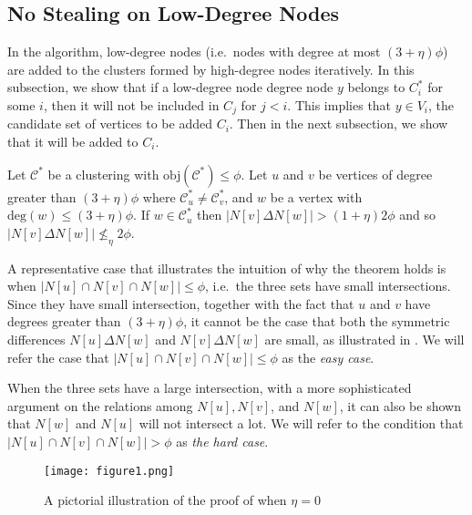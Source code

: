 \subsection{No Stealing on Low-Degree Nodes}\label{sec:nostealing}
In the algorithm, low-degree nodes (i.e.~nodes with degree at most $(3+\eta)\phi$) are added to the clusters formed by high-degree nodes iteratively. In this subsection, we show that if a low-degree node degree node $y$ belongs to $C^{*}_i$ for some $i$, then it will not be included in $C_j$ for $j<i$. This implies that $y \in V_i$, the candidate set of vertices to be added $C_i$. Then in the next subsection, we show that it will be added to $C_i$. 

\begin{theorem}\label{thm:nostealing}
Let $\mathcal{C}^\ast$ be a clustering with $\text{obj}(\mathcal{C}^{*}) \le \phi.$ Let $u$ and $v$ be vertices of degree greater than $(3+\eta)\phi$ where $\mathcal{C}^{*}_u \neq \mathcal{C}^{*}_v$, and $w$ be a vertex with $\text{deg}(w) \leq (3+\eta)\phi$. If $w \in \mathcal{C}^{*}_u$ then $|N[v] \Delta N[w]| > (1+\eta)2\phi$ and so $|N[v] \Delta N[w]| \nleq_{\eta} 2\phi$.
\end{theorem}

A representative case that illustrates the intuition of why the theorem holds is when $|N[u]\cap N[v] \cap N[w]| \leq \phi$, i.e.~the three sets have small intersections. Since they have small intersection, together with the fact that $u$ and $v$ have degrees greater than $(3+\eta) \phi$, it cannot be the case that both the symmetric differences $N[u] \Delta N[w]$ and $N[v] \Delta N[w]$ are small, as illustrated in . We will refer the case that $|N[u] \cap N[v] \cap N[w]| \leq \phi$ as the {\it easy case}. 


When the three sets have a large intersection, with a more sophisticated argument on the relations among $N[u], N[v]$, and $N[w]$, it can also be shown that $N[w]$ and $N[u]$ will not intersect a lot. We will refer to the condition that $|N[u] \cap N[v] \cap N[w]| > \phi$ as {\it the hard case}.
\begin{figure}
\centering
\texttt{[image: figure1.png]}
\caption{A pictorial illustration of the proof of  when $\eta = 0$}\label{fig:1}
\end{figure}
